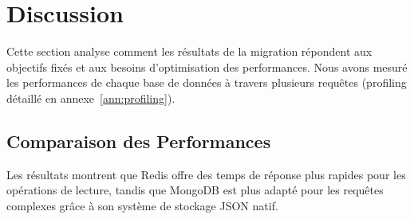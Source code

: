 \chapter{Discussion}
Cette section analyse comment les résultats de la migration répondent aux objectifs fixés et aux besoins d’optimisation des performances. Nous avons mesuré les performances de chaque base de données à travers plusieurs requêtes (profiling détaillé en annexe~\ref{ann:profiling}).

\section{Comparaison des Performances}
Les résultats montrent que Redis offre des temps de réponse plus rapides pour les opérations de lecture, tandis que MongoDB est plus adapté pour les requêtes complexes grâce à son système de stockage JSON natif.

